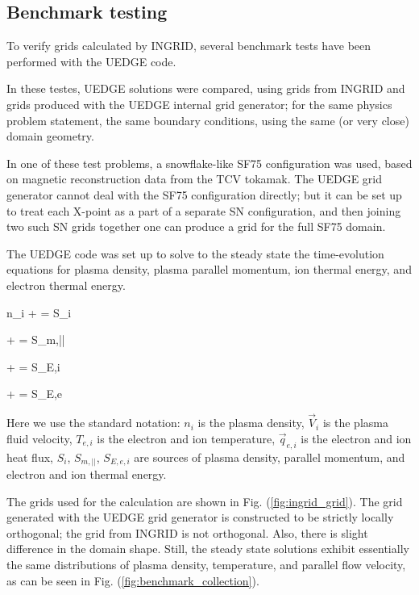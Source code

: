 \subsection{Benchmark testing}

To verify grids calculated by INGRID, several benchmark tests have
been performed with the UEDGE code.

In these testes, UEDGE solutions were compared, using grids from
INGRID and grids produced with the UEDGE internal grid generator; for
the same physics problem statement, the same boundary conditions,
using the same (or very close) domain geometry.

In one of these test problems, a snowflake-like SF75 configuration was
used, based on magnetic reconstruction data from the TCV tokamak. The
UEDGE grid generator cannot deal with the SF75 configuration directly;
but it can be set up to treat each X-point as a part of a separate SN
configuration, and then joining two such SN grids together one can
produce a grid for the full SF75 domain.

The UEDGE code was set up to solve to the steady state the
time-evolution equations for plasma density, plasma parallel momentum,
ion thermal energy, and electron thermal energy.


\beq
%
 n_i + \grad \cdot 
{}
= S_i
%
\eeq

\beq
{} \left[ M n_i {V}_{i,||} \right] + \grad \cdot
{}
= S_{m,||}
\eeq

\beq
{}
+
\grad \cdot
{} = S_{E,i}
%
\eeq

\beq
{}
+
\grad \cdot
{} = S_{E,e}
%
\eeq

Here we use the standard notation: $n_i$ is the plasma density,
$\vec{V}_i$ is the plasma fluid velocity, $T_{e,i}$ is the electron
and ion temperature, $\vec{q}_{e,i}$ is the electron and ion heat
flux, $S_i$, $S_{m,||}$, $S_{E,e,i}$ are sources of plasma density,
parallel momentum, and electron and ion thermal energy.

The grids used for the calculation are shown in Fig. (\ref{fig:ingrid_grid}). The
grid generated with the UEDGE grid generator is constructed to be
strictly locally orthogonal; the grid from INGRID is not
orthogonal. Also, there is slight difference in the domain
shape. Still, the steady state solutions exhibit essentially the same
distributions of plasma density, temperature, and parallel flow
velocity, as can be seen in Fig. (\ref{fig:benchmark_collection}).
